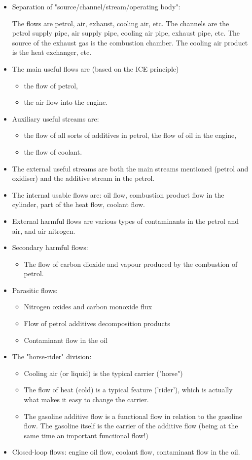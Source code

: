 \documentclass[a4paper,11pt]{article}
\begin{document}
\begin{itemize}
\item Separation of "source/channel/stream/operating body":

The flows are petrol, air, exhaust, cooling air, etc. The channels are the
petrol supply pipe, air supply pipe, cooling air pipe, exhaust pipe, etc. The
source of the exhaust gas is the combustion chamber. The cooling air product
is the heat exchanger, etc.
\item The main useful flows are (based on the ICE principle)
  \begin{itemize}
  \item the flow of petrol,
  \item the air flow into the engine.
  \end{itemize}
\item Auxiliary useful streams are:
  \begin{itemize}
  \item the flow of all sorts of additives in petrol, the flow of oil in the
    engine, 
  \item the flow of coolant.
  \end{itemize}
\item The external useful streams are both the main streams mentioned (petrol
  and oxidiser) and the additive stream in the petrol.
\item The internal usable flows are: oil flow, combustion product flow in the
  cylinder, part of the heat flow, coolant flow.
\item External harmful flows are various types of contaminants in the petrol
  and air, and air nitrogen.
\item Secondary harmful flows:
  \begin{itemize}
  \item The flow of carbon dioxide and vapour produced by the combustion of
    petrol.
  \end{itemize}
\item Parasitic flows:
  \begin{itemize}
  \item Nitrogen oxides and carbon monoxide flux
  \item Flow of petrol additives decomposition products
  \item Contaminant flow in the oil
  \end{itemize}
\item The "horse-rider" division:
  \begin{itemize}
  \item Cooling air (or liquid) is the typical carrier ("horse")
  \item The flow of heat (cold) is a typical feature ('rider'), which is
    actually what makes it easy to change the carrier.
  \item The gasoline additive flow is a functional flow in relation to the
    gasoline flow. The gasoline itself is the carrier of the additive flow
    (being at the same time an important functional flow!)
  \end{itemize}
\item Closed-loop flows: engine oil flow, coolant flow, contaminant flow in
  the oil.
\end{itemize}
\end{document}
